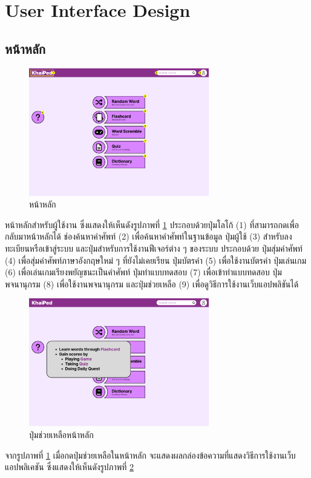 \documentclass[12pt,oneside,openright,a4paper]{cpe-thai-project}
\begin{document}
\pagebreak
\section{User Interface Design} \label{ssec:UI}
\subsection{หน้าหลัก}
\begin{figure}[!h]\centering
	\includegraphics[width=0.7\textwidth, keepaspectratio=true]{image/chap3/ui/Home page.png}
	\caption{หน้าหลัก}\label{fig:UI_Home}
\end{figure}
\hspace{1cm}
หน้าหลักสำหรับผู้ใช้งาน ซึ่งแสดงให้เห็นดังรูปภาพที่ \ref{fig:UI_Home} ประกอบด้วยปุ่มโลโก้ (1) ที่สามารถกดเพื่อกลับมาหน้าหลักได้ ช่องค้นหาคำศัพท์ (2) เพื่อค้นหาคำศัพท์ในฐานข้อมูล
ปุ่มผู้ใช้ (3) สำหรับลงทะเบียนหรือเข้าสู่ระบบ และปุ่มสำหรับการใช้งานฟีเจอร์ต่าง ๆ ของระบบ ประกอบด้วย
ปุ่มสุ่มคำศัพท์ (4) เพื่อสุ่มคำศัพท์ภาษาอังกฤษใหม่ ๆ ที่ยังไม่เคยเรียน ปุ่มบัตรคำ (5) เพื่อใช้งานบัตรคำ ปุ่มเล่นเกม (6) เพื่อเล่นเกมเรียงพยัญชนะเป็นคำศัพท์
ปุ่มทำแบบทดสอบ (7) เพื่อเข้าทำแบบทดสอบ ปุ่มพจนานุกรม (8) เพื่อใช้งานพจนานุกรม และปุ่มช่วยเหลือ (9) เพื่อดูวิธีการใช้งานเว็บแอปพลิชันได้

\pagebreak
\begin{figure}[!h]\centering
	\includegraphics[width=0.7\textwidth, keepaspectratio=true]{image/chap3/ui/Home page - Help.png}
	\caption{ปุ่มช่วยเหลือหน้าหลัก}\label{fig:UI_HomeHelp}
\end{figure}
\hspace{1cm}
จากรูปภาพที่ \ref{fig:UI_Home} เมื่อกดปุ่มช่วยเหลือในหน้าหลัก จะแสดงผลกล่องข้อความที่แสดงวิธีการใช้งานเว็บแอปพลิเคชัน ซึ่งแสดงให้เห็นดังรูปภาพที่ \ref{fig:UI_HomeHelp}
\end{document}
